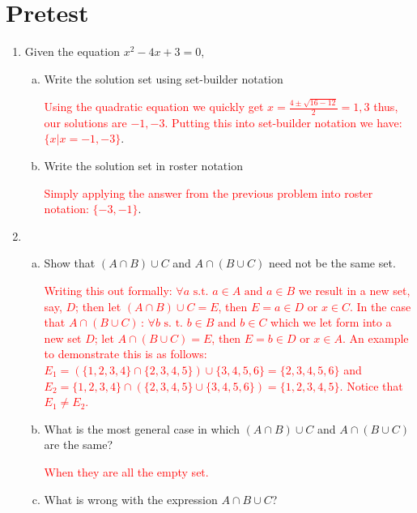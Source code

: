 \documentclass{article}
\begin{document}

\section{Pretest}

\begin{enumerate}
  \item Given the equation \( x^2-4x+3=0 \),
    \begin{enumerate}[(a)]
      \item Write the solution set using set-builder notation 
      
        \textcolor{red}{Using the quadratic equation we quickly get \( x=\frac{4\pm \sqrt{16-12} }{2}= 1,3 \) thus, our solutions are \( -1,-3 \). Putting this into set-builder notation we have: \( \{x|x=-1,-3\} \)}.

      \item Write the solution set in roster notation 

        \textcolor{red}{Simply applying the answer from the previous problem into roster notation: \( \{ -3,-1 \} \)}.

    \end{enumerate}


  \item \begin{enumerate}[(a)]
   \item Show that \( (A\cap B) \cup C \) and \( A\cap (B \cup C) \) need not be the same set.

     \textcolor{red}{Writing this out formally: \( \forall a\text{ s.t. } a \in A \text{ and } a\in B   \) we result in a new set, say, \( D \); then let \( (A\cap B) \cup C =E\), then \( E= a \in D \text{ or } x \in C \). In the case that \( A\cap (B \cup C)\, : \, \forall b \text{ s. t. } b\in B \text{ and } b\in C \) which we let form into a new set \( D \); let  \( A\cap (B \cup C)=E\), then \( E=b\in D \text{ or } x\in A\).  An example to demonstrate this is as follows: \(E_{1}=( \{ 1,2,3,4 \}\cap \{2,3,4,5\})\cup\{3,4,5,6\}=\{ 2,3,4,5,6\} \) and \( E_{2}=\{ 1,2,3,4\}\cap(\{2,3,4,5\}\cup\{3,4,5,6\})=\{1,2,3,4,5\} \). Notice that \( E_{1}\neq E_{2} \).}

    \item What is the most general case in which \( (A\cap B) \cup C \) and \( A\cap (B\cup C)\) are the same?

      \textcolor{red}{When they are all the empty set.}

      
      \item What is wrong with the expression \( A \cap B \cup C \)? 


\end{enumerate}
\end{enumerate}
\end{document}
